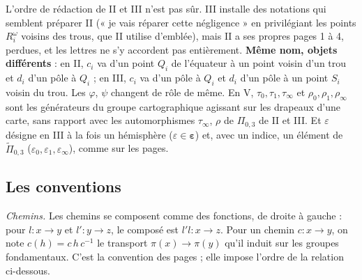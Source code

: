\documentclass[11pt,a4paper]{article}
\begin{document}
L'ordre de rédaction de II et III n'est pas sûr. III installe des notations
qui semblent préparer II (« je vais réparer cette négligence » en privilégiant
les points $R_i^{\omega}$ voisins des trous, que II utilise d'emblée), mais
II a ses propres pages 1 à 4, perdues, et les lettres ne s'y accordent pas
entièrement. \textbf{Même nom, objets différents} : en II, $c_i$ va d'un
point $Q_i$ de l'équateur à un point voisin d'un trou et $d_i$ d'un pôle à
$Q_i$ ; en III, $c_i$ va d'un pôle à $Q_i$ et $d_i$ d'un pôle à un point
$S_i$ voisin du trou. Les $\varphi$, $\psi$ changent de rôle de même. En V,
$\tau_0, \tau_1, \tau_\infty$ et $\rho_0, \rho_1, \rho_\infty$ sont les
générateurs du groupe cartographique agissant sur les drapeaux d'une carte,
sans rapport avec les automorphismes $\tau_\infty$, $\rho$ de
$\Pi_{0,3}$ de II et III. Et $\varepsilon$ désigne en III à la fois un
hémisphère ($\varepsilon \in \boldsymbol{\varepsilon}$) et, avec un indice,
un élément de $\widetilde\Pi_{0,3}$ ($\varepsilon_0, \varepsilon_1,
\varepsilon_\infty$), comme sur les pages.

\subsection*{Les conventions}

\emph{Chemins.} Les chemins se composent comme des fonctions, de droite à
gauche : pour $l : x \to y$ et $l' : y \to z$, le composé est $l' l : x \to z$.
Pour un chemin $c : x \to y$, on note $c(h) = c\,h\,c^{-1}$ le transport
$\pi(x) \to \pi(y)$ qu'il induit sur les groupes fondamentaux. C'est la
convention des pages ; elle impose l'ordre de la relation ci-dessous.
\end{document}
